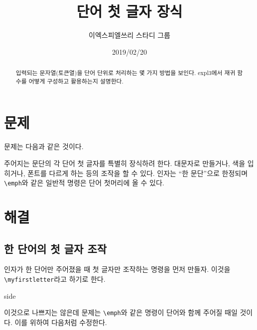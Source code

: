 \documentclass[a4paper]{oblivoir}
\title{단어 첫 글자 장식}
\author{이엑스피엘쓰리 스타디 그룹}
\date{2019/02/20}
\begin{document}
\maketitle


\begin{abstract}
    입력되는 문자열(토큰열)을 단어 단위로 처리하는 몇 가지 방법을 
    보인다. expl3에서 재귀 함수를 어떻게 구성하고 활용하는지 설명한다.
\end{abstract}

\tableofcontents*

\section{문제}

문제는 다음과 같은 것이다.

\smallskip

\begin{tcolorbox}
    주어지는 문단의 각 단어 첫 글자를 특별히 장식하려 한다. 대문자로 만들거나, 색을 입히거나, 폰트를 다르게 하는 등의 조작을 할 수 있다.
    인자는 ``한 문단''으로 한정되며 \verb|\emph|와 같은 일반적 명령은 단어 첫머리에 올 수 있다.
\end{tcolorbox}

\section{해결}

\subsection{한 단어의 첫 글자 조작}

인자가 한 단어만 주어졌을 때 첫 글자만 조작하는 명령을 먼저 만들자. 이것을 \verb|\myfirstletter|\allowbreak 라고 하기로 한다.


\begin{mylistingtext}{side}
\end{mylistingtext}

이것으로 나쁘지는 않은데 문제는 \verb|\emph|와 같은 명령이 단어와 함께 주어질 때일 것이다. 이를 위하여 다음처럼 수정한다.

\end{document}
